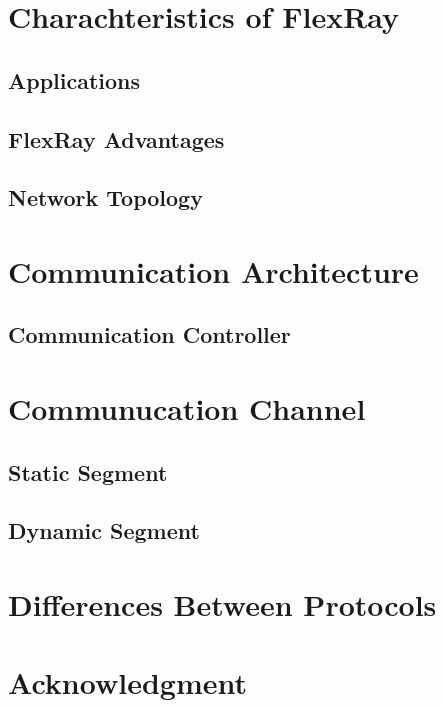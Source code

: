 \documentclass[conference]{IEEEtran}
\begin{document}
\section{Charachteristics of FlexRay}


\subsection{Applications}


\subsection{FlexRay Advantages}

\subsection{Network Topology}

\section{Communication Architecture}

\subsection{Communication Controller}

\section{Communucation Channel}


\subsection{Static Segment}

\subsection{Dynamic Segment}

\section{Differences Between Protocols}
\section*{Acknowledgment}



\end{document}
